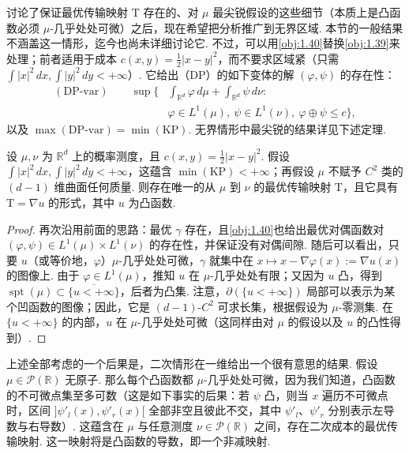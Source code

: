 讨论了保证最优传输映射 $\mathrm{T}$ 存在的、对 $\mu$ 最尖锐假设的这些细节（本质上是凸函数必须 $\mu$-几乎处处可微）之后，现在希望把分析推广到无界区域. 本节的一般结果不涵盖这一情形，迄今也尚未详细讨论它. 不过，可以用\autoref{obj:1.40}替换\autoref{obj:1.39}来处理；前者适用于成本 $c(x,y)=\frac12|x-y|^2$，而不要求区域紧（只需 $\int|x|^2\,dx,\int|y|^2\,dy<+\infty$）. 它给出（DP）的如下变体的解 $(\varphi,\psi)$ 的存在性：
\begin{equation*}
\begin{aligned}
(\mathrm{DP}\text{-}\mathrm{var})\qquad
\sup\biggl\{&\int_{\mathbb R^d}\varphi\,d\mu+\int_{\mathbb R^d}\psi\,d\nu:\\
&\varphi\in L^1(\mu),\ \psi\in L^1(\nu),\ \varphi\oplus\psi\le c\biggr\},
\end{aligned}
\end{equation*}
以及 $\max(\mathrm{DP}\text{-}\mathrm{var})=\min(\mathrm{KP})$. 无界情形中最尖锐的结果详见下述定理.

\begin{theorem}\label{obj:1.22}
设 $\mu,\nu$ 为 $\mathbb R^d$ 上的概率测度，且 $c(x,y)=\frac12|x-y|^2$. 假设 $\int|x|^2\,dx,\int|y|^2\,dy<+\infty$，这蕴含 $\min(\mathrm{KP})<+\infty$；再假设 $\mu$ 不赋予 $C^2$ 类的 $(d-1)$ 维曲面任何质量. 则存在唯一的从 $\mu$ 到 $\nu$ 的最优传输映射 $\mathrm{T}$，且它具有 $\mathrm{T}=\nabla u$ 的形式，其中 $u$ 为凸函数.
\end{theorem}
\begin{proof}
再次沿用前面的思路：最优 $\gamma$ 存在，且\autoref{obj:1.40}也给出最优对偶函数对 $(\varphi,\psi)\in L^1(\mu)\times L^1(\nu)$ 的存在性，并保证没有对偶间隙. 随后可以看出，只要 $u$（或等价地，$\varphi$）$\mu$-几乎处处可微，$\gamma$ 就集中在 $x\mapsto x-\nabla\varphi(x):=\nabla u(x)$ 的图像上. 由于 $\varphi\in L^1(\mu)$，推知 $u$ 在 $\mu$-几乎处处有限；又因为 $u$ 凸，得到 $\operatorname{spt}(\mu)\subset\overline{\{u<+\infty\}}$，后者为凸集. 注意，$\partial(\{u<+\infty\})$ 局部可以表示为某个凹函数的图像；因此，它是 $(d-1)$-$C^2$ 可求长集，根据假设为 $\mu$-零测集. 在 $\{u<+\infty\}$ 的内部，$u$ 在 $\mu$-几乎处处可微（这同样由对 $\mu$ 的假设以及 $u$ 的凸性得到）.
\end{proof}

\begin{remark}\label{obj:1.23}
上述全部考虑的一个后果是，二次情形在一维给出一个很有意思的结果. 假设 $\mu\in\mathscr P(\mathbb R)$ 无原子. 那么每个凸函数都 $\mu$-几乎处处可微，因为我们知道，凸函数的不可微点集至多可数（这是如下事实的后果：若 $\psi$ 凸，则当 $x$ 遍历不可微点时，区间 $]\psi'_l(x),\psi'_r(x)[$ 全部非空且彼此不交，其中 $\psi'_l$、$\psi'_r$ 分别表示左导数与右导数）. 这蕴含在 $\mu$ 与任意测度 $\nu\in\mathscr P(\mathbb R)$ 之间，存在二次成本的最优传输映射. 这一映射将是凸函数的导数，即一个非减映射.
\end{remark}

